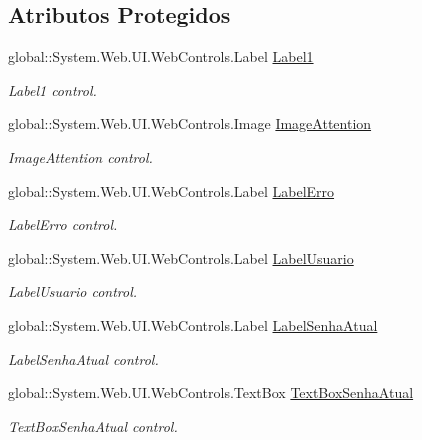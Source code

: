 \subsection*{Atributos Protegidos}
\begin{DoxyCompactItemize}
\item 
global::System.Web.UI.WebControls.Label \hyperlink{class_sistema_r_h_1_1_altera_senha_aeb89d65f52a383c6771a4cff847360bf}{Label1}
\begin{DoxyCompactList}\small\item\em Label1 control. \item\end{DoxyCompactList}\item 
global::System.Web.UI.WebControls.Image \hyperlink{class_sistema_r_h_1_1_altera_senha_a88bf28b77f1c6c0c129139f1f2a53696}{ImageAttention}
\begin{DoxyCompactList}\small\item\em ImageAttention control. \item\end{DoxyCompactList}\item 
global::System.Web.UI.WebControls.Label \hyperlink{class_sistema_r_h_1_1_altera_senha_ab821993f47e320b0d86f898fcde56d56}{LabelErro}
\begin{DoxyCompactList}\small\item\em LabelErro control. \item\end{DoxyCompactList}\item 
global::System.Web.UI.WebControls.Label \hyperlink{class_sistema_r_h_1_1_altera_senha_ac17b3383fc4877fb40f0abc0a03cfcc7}{LabelUsuario}
\begin{DoxyCompactList}\small\item\em LabelUsuario control. \item\end{DoxyCompactList}\item 
global::System.Web.UI.WebControls.Label \hyperlink{class_sistema_r_h_1_1_altera_senha_a4f301cec0dc4bf560db478c244a2a454}{LabelSenhaAtual}
\begin{DoxyCompactList}\small\item\em LabelSenhaAtual control. \item\end{DoxyCompactList}\item 
global::System.Web.UI.WebControls.TextBox \hyperlink{class_sistema_r_h_1_1_altera_senha_ad5de6c8ba0b3eb9fa58674a4b53531c7}{TextBoxSenhaAtual}
\begin{DoxyCompactList}\small\item\em TextBoxSenhaAtual control. \item\end{DoxyCompactList}\item 

\end{DoxyCompactItemize}
